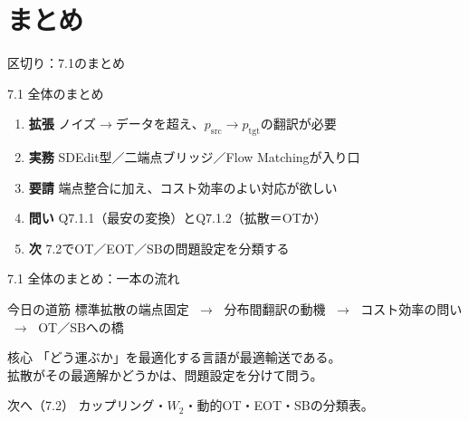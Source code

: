 \section{まとめ}
\asmain
\begin{frame}{区切り：7.1のまとめ}
    \tableofcontents[currentsection]
\end{frame}
\asmain
\begin{frame}{7.1 全体のまとめ}
    \begin{enumerate}
        \item \textbf{拡張}
        ノイズ$\to$データを超え、$p_{\mathrm{src}}\to p_{\mathrm{tgt}}$の翻訳が必要
        \item \textbf{実務}
        SDEdit型／二端点ブリッジ／Flow Matchingが入り口
        \item \textbf{要請}
        端点整合に加え、コスト効率のよい対応が欲しい
        \item \textbf{問い}
        Q7.1.1（最安の変換）とQ7.1.2（拡散＝OTか）
        \item \textbf{次}
        7.2でOT／EOT／SBの問題設定を分類する
    \end{enumerate}
\end{frame}
\asmain
\begin{frame}{7.1 全体のまとめ：一本の流れ}
    \begin{block}{今日の道筋}
        標準拡散の端点固定
        $\;\to\;$
        分布間翻訳の動機
        $\;\to\;$
        コスト効率の問い
        $\;\to\;$
        OT／SBへの橋
    \end{block}
    \begin{block}{核心}
        「どう運ぶか」を最適化する言語が最適輸送である。\\
        拡散がその最適解かどうかは、問題設定を分けて問う。
    \end{block}
    \begin{block}{次へ（7.2）}
        カップリング・$W_2$・動的OT・EOT・SBの分類表。
    \end{block}
\end{frame}
